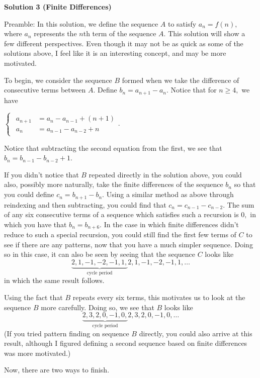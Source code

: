 \begin{enumerate}
\textbf{Solution 3 (Finite Differences)}

Preamble: In this solution, we define the sequence $A$ to satisfy $a_n = f(n),$ where $a_n$ represents the $n$th term of the sequence $A.$ This solution will show a few different perspectives. Even though it may not be as quick as some of the solutions above, I feel like it is an interesting concept, and may be more motivated. 

 To begin, we consider the sequence $B$ formed when we take the difference of consecutive terms between $A.$ Define $b_n = a_{n+1} - a_n.$ Notice that for $n \ge 4,$ we have 

 $\begin{cases}\begin{aligned} a_{n+1} &= a_{n} - a_{n-1} + (n+1) \\ a_{n} &= a_{n-1} - a_{n-2} + n \end{aligned}.\end{cases}$

  Notice that subtracting the second equation from the first, we see that $b_{n} = b_{n-1} - b_{n-2} + 1.$ 

 If you didn’t notice that $B$ repeated directly in the solution above, you could also, possibly more naturally, take the finite differences of the sequence $b_n$ so that you could define $c_n = b_{n+1} - b_n.$ Using a similar method as above through reindexing and then subtracting, you could find that $c_n = c_{n-1} - c_{n-2}.$ The sum of any six consecutive terms of a sequence which satisfies such a recursion is $0,$ in which you have that $b_{n} = b_{n+6}.$ In the case in which finite differences didn’t reduce to such a special recursion, you could still find the first few terms of $C$ to see if there are any patterns, now that you have a much simpler sequence. Doing so in this case, it can also be seen by seeing that the sequence $C$ looks like 
 \[\underbrace{2, 1, -1, -2, -1, 1,}_{\text{cycle period}} 2, 1, -1, -2, -1, 1, \ldots\] in which the same result follows. 

 Using the fact that $B$ repeats every six terms, this motivates us to look at the sequence $B$ more carefully. Doing so, we see that $B$ looks like 
 \[\underbrace{2, 3, 2, 0, -1, 0,}_{\text{cycle period}} 2, 3, 2, 0, -1, 0, \ldots\] (If you tried pattern finding on sequence $B$ directly, you could also arrive at this result, although I figured defining a second sequence based on finite differences was more motivated.)

 Now, there are two ways to finish. 


\end{enumerate}
